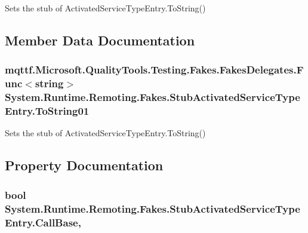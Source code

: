 Sets the stub of Activated\-Service\-Type\-Entry.\-To\-String()



\subsection{Member Data Documentation}
\hypertarget{class_system_1_1_runtime_1_1_remoting_1_1_fakes_1_1_stub_activated_service_type_entry_afa8b457c75dc944f189793d97d99b3f7}{
\subsubsection[{To\-String01}]{\setlength{\rightskip}{0pt plus 5cm}mqttf.\-Microsoft.\-Quality\-Tools.\-Testing.\-Fakes.\-Fakes\-Delegates.\-Func$<$string$>$ System.\-Runtime.\-Remoting.\-Fakes.\-Stub\-Activated\-Service\-Type\-Entry.\-To\-String01}}\label{class_system_1_1_runtime_1_1_remoting_1_1_fakes_1_1_stub_activated_service_type_entry_afa8b457c75dc944f189793d97d99b3f7}


Sets the stub of Activated\-Service\-Type\-Entry.\-To\-String()



\subsection{Property Documentation}
\hypertarget{class_system_1_1_runtime_1_1_remoting_1_1_fakes_1_1_stub_activated_service_type_entry_a3ba273ada642bf7ddf99ca4256edc72a}{
\subsubsection[{Call\-Base}]{\setlength{\rightskip}{0pt plus 5cm}bool System.\-Runtime.\-Remoting.\-Fakes.\-Stub\-Activated\-Service\-Type\-Entry.\-Call\-Base\hspace{0.3cm}{\ttfamily [get]}, {\ttfamily [set]}}}\label{class_system_1_1_runtime_1_1_remoting_1_1_fakes_1_1_stub_activated_service_type_entry_a3ba273ada642bf7ddf99ca4256edc72a}


